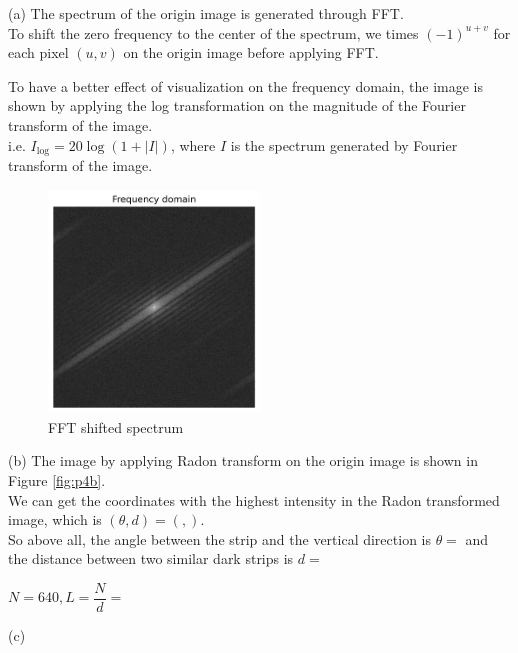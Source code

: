(a) The spectrum of the origin image is generated through FFT.\\
To shift the zero frequency to the center of the spectrum, we times $(-1)^{u+v}$ for each pixel $(u,v)$ on the origin image before applying FFT.

To have a better effect of visualization on the frequency domain, the image is shown by applying the log transformation on the magnitude of the Fourier transform of the image.\\
i.e. $I_{\text{log}}=20\log(1+|I|)$, where $I$ is the spectrum generated by Fourier transform of the image.

\begin{figure}[htbp]
    \centering
	\includegraphics[width=0.5\textwidth]{../images/p4/p4a.png}
    \caption{FFT shifted spectrum}
    \label{fig:p4a}
\end{figure}

(b) The image by applying Radon transform on the origin image is shown in Figure \ref{fig:p4b}.\\
We can get the coordinates with the highest intensity in the Radon transformed image, which is $(\theta,d)=(,)$.\\

So above all, the angle between the strip and the vertical direction is $\theta=$
and the distance between two similar dark strips is $d=$

$N=640,L=\dfrac{N}{d}=$





(c)







\newpage